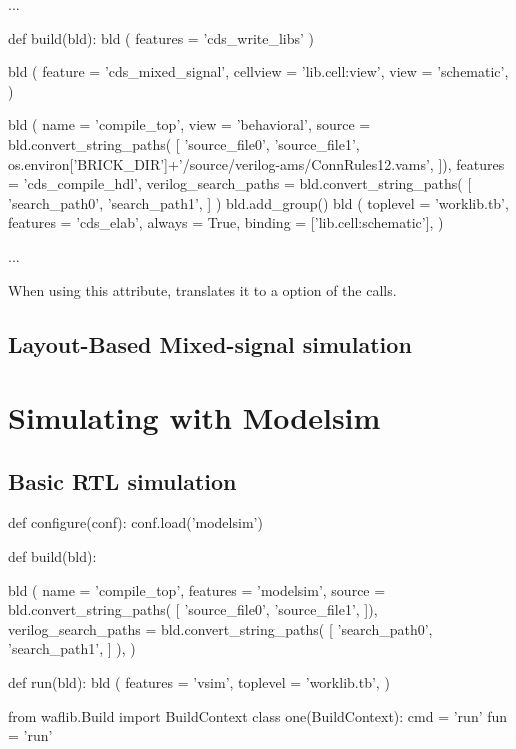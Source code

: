 \begin{lstwscript}
...

def build(bld):
    bld ( features = 'cds_write_libs' )

    bld (
        feature = 'cds_mixed_signal',
        cellview = 'lib.cell:view',
        view = 'schematic',
    )

    bld (
        name = 'compile_top',
        view = 'behavioral',
        source = bld.convert_string_paths(
            [
                'source_file0',
                'source_file1',
                os.environ['BRICK_DIR']+'/source/verilog-ams/ConnRules12.vams',
            ]),
        features = 'cds_compile_hdl',
        verilog_search_paths = bld.convert_string_paths(
            [
                'search_path0',
                'search_path1',
            ]
    )
    bld.add_group()
    bld (
        toplevel = 'worklib.tb',
        features = 'cds_elab',
        always = True,
        binding = ['lib.cell:schematic'],
    )

...
\end{lstwscript}

When using this attribute,  translates it to a  option of
the  calls.

\subsection{Layout-Based Mixed-signal simulation}

\section{Simulating with Modelsim}
\subsection{Basic RTL simulation}

\begin{lstwscript}
def configure(conf):
    conf.load('modelsim')

def build(bld):

    bld (
        name = 'compile_top',
        features = 'modelsim',
		source = bld.convert_string_paths(
            [
                'source_file0',
                'source_file1',
            ]),
        verilog_search_paths = bld.convert_string_paths(
            [
                'search_path0',
                'search_path1',
            ]
        ),
    )   


def run(bld):
    bld (
        features = 'vsim',
        toplevel = 'worklib.tb',
    )   

from waflib.Build import BuildContext
class one(BuildContext):
    cmd = 'run'
    fun = 'run'
\end{lstwscript}

